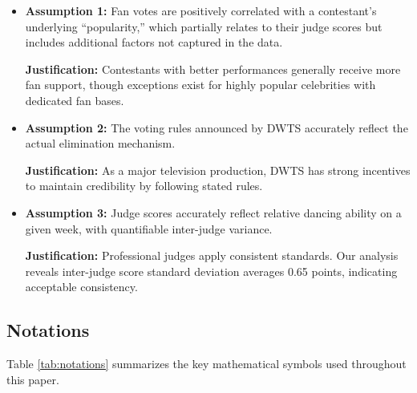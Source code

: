 \documentclass{mcmthesis}
\begin{document}
\begin{itemize}[parsep=0pt, itemsep=0pt, topsep=5pt, leftmargin=*]

\item \textbf{Assumption 1:} Fan votes are positively correlated with a contestant's underlying ``popularity,'' which partially relates to their judge scores but includes additional factors not captured in the data.

\textbf{Justification:} Contestants with better performances generally receive more fan support, though exceptions exist for highly popular celebrities with dedicated fan bases.

\item \textbf{Assumption 2:} The voting rules announced by DWTS accurately reflect the actual elimination mechanism.

\textbf{Justification:} As a major television production, DWTS has strong incentives to maintain credibility by following stated rules.

\item \textbf{Assumption 3:} Judge scores accurately reflect relative dancing ability on a given week, with quantifiable inter-judge variance.

\textbf{Justification:} Professional judges apply consistent standards. Our analysis reveals inter-judge score standard deviation averages 0.65 points, indicating acceptable consistency.

\end{itemize}


\subsection{Notations}

Table \ref{tab:notations} summarizes the key mathematical symbols used throughout this paper.
\end{document}

